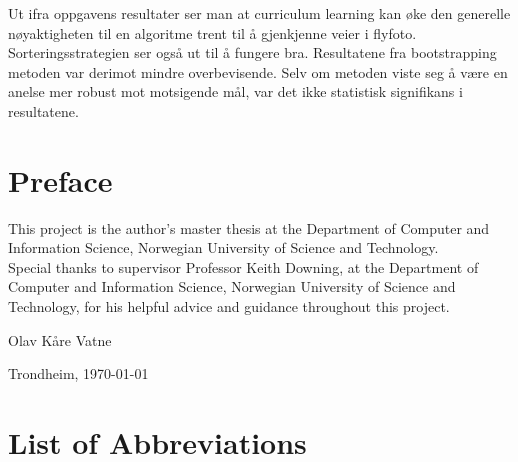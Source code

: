 \documentclass[a4paper]{book}
\newcommand{\thesisAuthor}{Olav Kåre Vatne}
\begin{document}
Ut ifra oppgavens resultater ser man at curriculum learning kan øke den generelle nøyaktigheten til en algoritme trent til å gjenkjenne veier i flyfoto. Sorteringsstrategien ser også ut til å fungere bra. Resultatene fra bootstrapping metoden var derimot mindre overbevisende. Selv om metoden viste seg å være en anelse mer robust mot motsigende mål, var det ikke statistisk signifikans i resultatene.
\clearpage

\section*{Preface}
\vspace{1cm}

This project is the author's master thesis at the Department of Computer and Information
Science, Norwegian University of Science and Technology. \\

Special thanks to supervisor Professor Keith Downing, at the Department of Computer
and Information Science, Norwegian University of Science and Technology, for his
helpful advice and guidance throughout this project. \\



\vfill

\hfill \thesisAuthor

\hfill Trondheim, \today

\clearpage

\section*{List of Abbreviations}
\vspace{1cm}
\begin{acronym}
\end{acronym}



\tableofcontents

\listoffigures
\end{document}
